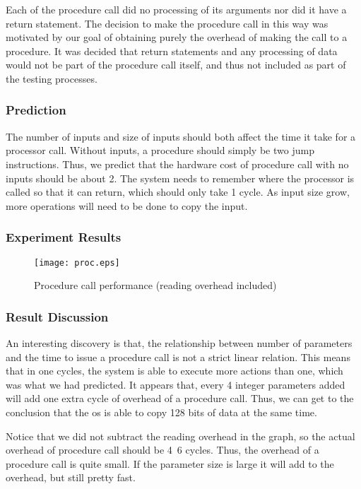\documentclass{article} %
\begin{document}
Each of the procedure call did no processing of its arguments nor did it have
a return statement. The decision to make the procedure call in this way was
motivated by our goal of obtaining purely the overhead of making the call to
a procedure. It was decided that return statements and any processing of data
would not be part of the procedure call itself, and thus not included as part
of the testing processes.

\subsubsection{Prediction}
The number of inputs and size of inputs should both affect the time it
take for a processor call. Without inputs, a procedure should simply be two
jump instructions. Thus, we predict that the hardware cost of procedure call
with no inputs should be about 2. The system needs to remember where the
processor is called so that it can return, which should only take 1 cycle. As
input size grow, more operations will need to be done to copy the
input.

\subsubsection{Experiment Results}

\begin{figure}[!htb]
\centering
\texttt{[image: proc.eps]}
\caption{Procedure call performance (reading overhead included)}
\label{fig:proc}
\end{figure}

\subsubsection{Result Discussion}
An interesting discovery is that, the relationship between number of
parameters and the time to issue a procedure call is not a strict linear
relation. This means that in one cycles, the system is able to execute more actions than one, which was what we had predicted.
It appears that, every 4 integer parameters added will add one extra cycle of
overhead of a procedure call. Thus, we can get to the conclusion that the os
is able to copy 128 bits of data at the same time.

Notice that we did not subtract the reading overhead in the graph, so the
actual overhead of procedure call should be 4~6 cycles. Thus, the overhead of
a procedure call is quite small. If the parameter size is large it will add to
the overhead, but still pretty fast.
\end{document}
